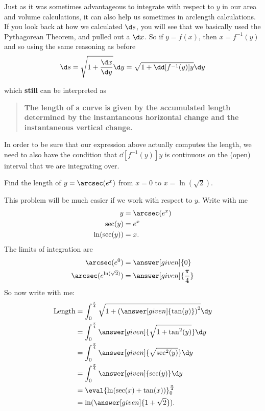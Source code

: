 \documentclass{ximera}
\begin{document}
Just as it was sometimes advantageous to integrate with respect to
$y$ in our area and volume calculations, it can also help us sometimes
in arclength calculations.  If you look back at how we calculated $\d
s$, you will see that we basically used the Pythagorean Theorem, and
pulled out a $\d x$.  So if $y = f(x)$, then $x = f^{-1}(y)$ and so
using the same reasoning as before
\[
\d s = \sqrt{1+\frac{\d x}{\d y}} \d y  = \sqrt{1+\dd[f^{-1}(y)]{y}} \d y
\]
\begin{image}
\end{image}
which \textbf{still} can be interpreted as
\begin{quote}
  \textbf{The length of a curve is given by the
    \textcolor{green!70!black!70!blue}{accumulated}
    \textcolor{purple!50!blue!90!black}{length determined by the
      instantaneous horizontal change and the instantaneous vertical
      change}.}
\end{quote}

\begin{warning}
  In order to be sure that our expression above actually computes the
  length, we need to also have the condition that $\dd[f^{-1}(y)]{y}$ is
  continuous on the (open) interval that we are integrating over.
\end{warning}

\begin{example}
  Find the length of $y = \arcsec(e^x)$ from $x= 0$ to
  $x=\ln(\sqrt{2})$.
  \begin{explanation}
    This problem will be much easier if we work with respect to $y$. Write with me
    \begin{align*}
      y &= \arcsec(e^x)\\
      \sec(y) &= e^x\\
      \ln(\sec(y)) &= x.
    \end{align*}
    The limits of integration are
    \begin{align*}
      \arcsec(e^0) &= \answer[given]{0}\\
      \arcsec(e^{\ln(\sqrt{2})}) &= \answer[given]{\frac{\pi}{4}}
    \end{align*}
    So now write with me:
    \begin{align*}
      \text{Length} &= \int_0^{\frac{\pi}{4}} \sqrt{1+\left( \answer[given]{\tan(y)} \right)^2} \d y\\
      &=\int_0^{\frac{\pi}{4}} \answer[given]{\sqrt{1+\tan^2(y)}}\d y\\
      &=\int_0^{\frac{\pi}{4}} \answer[given]{\sqrt{\sec^2(y)}}\d y\\
      &=\int_0^{\frac{\pi}{4}} \answer[given]{\sec(y)} \d y\\
      &=\eval{\ln(\sec(x)+\tan(x))}_0^\frac{\pi}{4}\\
      &=\ln(\answer[given]{1+\sqrt{2}}).
    \end{align*}
  \end{explanation}
\end{example}
\end{document}
